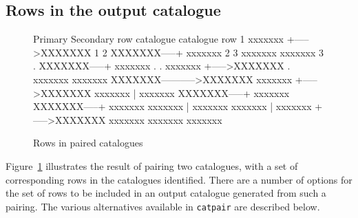 \documentclass[twoside,11pt]{starlink}
\begin{document}
\subsection{\label{PAIR_PRTYP}Rows in the output catalogue}

\begin{figure}[htbp]

\begin{terminalv}
               Primary           Secondary
          row catalogue          catalogue row
           1   xxxxxxx     +----->XXXXXXX   1
           2   XXXXXXX-----+      xxxxxxx   2
           3   xxxxxxx            xxxxxxx   3
           .   XXXXXXX-----+      xxxxxxx   .
           .   xxxxxxx     +----->XXXXXXX   .
               xxxxxxx            xxxxxxx
               XXXXXXX----------->XXXXXXX
               xxxxxxx     +----->XXXXXXX
               xxxxxxx     |      xxxxxxx
               XXXXXXX-----+      xxxxxxx
               XXXXXXX-----+      xxxxxxx
               xxxxxxx     |      xxxxxxx
               xxxxxxx     |      xxxxxxx
                           +----->XXXXXXX
                                  xxxxxxx
                                  xxxxxxx
                                  xxxxxxx
\end{terminalv}

\caption{Rows in paired catalogues \label{PAIR_JOINED_CAT} }

\end{figure}

Figure~\ref{PAIR_JOINED_CAT} illustrates the result of pairing two catalogues,
with a set of corresponding rows in the catalogues identified. There are a
number of options for the set of rows to be included in an output catalogue
generated from such a pairing. The various alternatives available in
\texttt{catpair} are described below.
\end{document}
